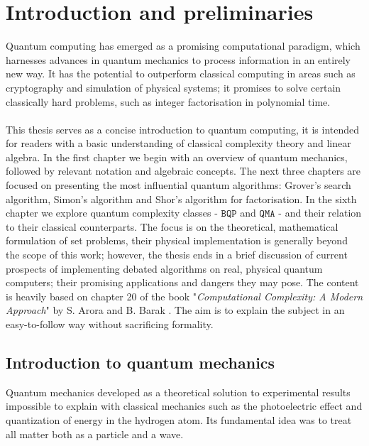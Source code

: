 \section{Introduction and preliminaries}
Quantum computing has emerged as a promising computational paradigm, which harnesses advances in quantum mechanics to process information in an entirely new way. It has the potential to outperform classical computing in areas such as cryptography and simulation of physical systems; it promises to solve certain classically hard problems, such as integer factorisation in polynomial time.
\\\\This thesis serves as a concise introduction to quantum computing, it is intended for readers with a basic understanding of classical complexity theory and linear algebra. In the first chapter we begin with an overview of quantum mechanics, followed by relevant notation and algebraic concepts. The next three chapters are focused on presenting the most influential quantum algorithms: Grover's search algorithm, Simon's algorithm and Shor's algorithm for factorisation. In the sixth chapter we explore quantum complexity classes - $\mathtt{BQP}$ and $\mathtt{QMA}$ - and their relation to their classical counterparts. The focus is on the theoretical, mathematical formulation of set problems, their physical implementation is generally beyond the scope of this work; however, the thesis ends in a brief discussion of current prospects of implementing debated algorithms on real, physical quantum computers; their promising applications and dangers they may pose. The content is heavily based on chapter 20 of the book "\textit{Computational Complexity: A Modern Approach}" by S. Arora and B. Barak \cite{thebook}. The aim is to explain the subject in an easy-to-follow way without sacrificing formality.
\subsection{Introduction to quantum mechanics}
Quantum mechanics developed as a theoretical solution to experimental results impossible to explain with classical mechanics such as the photoelectric effect and quantization of energy in the hydrogen atom. Its fundamental idea was to treat all matter both as a particle and a wave.
